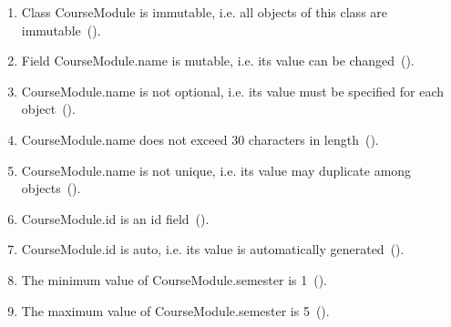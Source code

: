 	\begin{enumerate}
		\item Class CourseModule is immutable, i.e. all objects of this class are immutable~().
		\item Field CourseModule.name is mutable, i.e. its value can be changed~().
		\item CourseModule.name is not optional, i.e. its value must be specified for each object~().
		\item CourseModule.name does not exceed 30 characters in length~().
		\item CourseModule.name is not unique, i.e. its value may duplicate among objects~().
		\item CourseModule.id is an id field~().
		\item CourseModule.id is auto, i.e. its value is automatically generated~().
		\item The minimum value of CourseModule.semester is 1~().
		\item The maximum value of CourseModule.semester is 5~().
	\end{enumerate}

